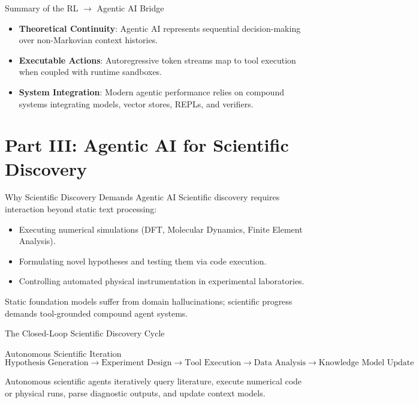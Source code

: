 \documentclass[10pt, aspectratio=169]{beamer}
\begin{document}
\begin{frame}{Summary of the RL $\to$ Agentic AI Bridge}
  \begin{itemize}
    \item \textbf{Theoretical Continuity}: Agentic AI represents sequential decision-making over non-Markovian context histories.
    \item \textbf{Executable Actions}: Autoregressive token streams map to tool execution when coupled with runtime sandboxes.
    \item \textbf{System Integration}: Modern agentic performance relies on compound systems integrating models, vector stores, REPLs, and verifiers.
  \end{itemize}
\end{frame}

\section{Part III: Agentic AI for Scientific Discovery}

\begin{frame}{Why Scientific Discovery Demands Agentic AI}
  Scientific discovery requires interaction beyond static text processing:
  \begin{itemize}
    \item Executing numerical simulations (DFT, Molecular Dynamics, Finite Element Analysis).
    \item Formulating novel hypotheses and testing them via code execution.
    \item Controlling automated physical instrumentation in experimental laboratories.
  \end{itemize}
  Static foundation models suffer from domain hallucinations; scientific progress demands tool-grounded compound agent systems.
\end{frame}

\begin{frame}{The Closed-Loop Scientific Discovery Cycle}
  \begin{block}{Autonomous Scientific Iteration}
    $$\text{Hypothesis Generation} \longrightarrow \text{Experiment Design} \longrightarrow \text{Tool Execution} \longrightarrow \text{Data Analysis} \longrightarrow \text{Knowledge Model Update}$$
  \end{block}
  Autonomous scientific agents iteratively query literature, execute numerical code or physical runs, parse diagnostic outputs, and update context models.
\end{frame}
\end{document}
